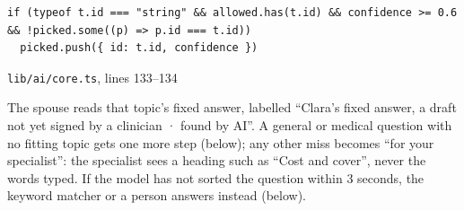 \documentclass[10.5pt,a4paper]{article}
\newcommand{\code}[1]{\texttt{\small #1}}
\begin{document}
\begin{Verbatim}
if (typeof t.id === "string" && allowed.has(t.id) && confidence >= 0.6 && !picked.some((p) => p.id === t.id))
  picked.push({ id: t.id, confidence })
\end{Verbatim}
{\footnotesize\color{muted}\code{lib/ai/core.ts}, lines 133–134}

The spouse reads that topic's fixed answer, labelled ``Clara's fixed answer, a draft not yet signed by a clinician
· found by AI''. A general or medical question
with no fitting topic gets one more step (below); any other miss becomes ``for your specialist'': the specialist sees a heading such as ``Cost and cover'', never the words typed. If the model has not
sorted the question within 3 seconds, the keyword matcher or a person answers instead (below).
\end{document}
